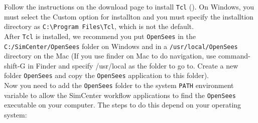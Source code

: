 Follow the instructions on the download page to install \texttt{Tcl}
(). On Windows, you must select the Custom option for installton and you must specify
the installtion directory as \texttt{C:\textbackslash Program Files\textbackslash Tcl}, 
which is not the default. \\

After \texttt{Tcl} is installed, we recommend you put \texttt{OpenSees} in
the \texttt{C:/SimCenter/OpenSees} folder on Windows and in
a \texttt{/usr/local/OpenSees} directory on the Mac (If you use finder
on Mac to do navigation, use command-shift-G in Finder and specify
/usr/local as the folder to go to. Create a new folder \texttt{OpenSees}
and copy the \texttt{OpenSees} application to this folder).\\


Now you need to add the \texttt{OpenSees} folder to the
system \texttt{PATH} environment variable to allow the SimCenter
workflow applications to find the \texttt{OpenSees} executable on your
computer. The steps to do this depend on your operating system:


